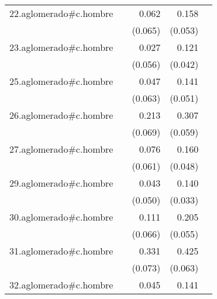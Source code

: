 {\begin{longtable}{l*{4}{D{.}{.}{-1}}}
\addlinespace
22.aglomerado#c.hombre&                     &       0.062         &       0.158\sym{**} &                     \\
            &                     &     (0.065)         &     (0.053)         &                     \\
\addlinespace
23.aglomerado#c.hombre&                     &       0.027         &       0.121\sym{**} &                     \\
            &                     &     (0.056)         &     (0.042)         &                     \\
\addlinespace
25.aglomerado#c.hombre&                     &       0.047         &       0.141\sym{**} &                     \\
            &                     &     (0.063)         &     (0.051)         &                     \\
\addlinespace
26.aglomerado#c.hombre&                     &       0.213\sym{**} &       0.307\sym{***}&                     \\
            &                     &     (0.069)         &     (0.059)         &                     \\
\addlinespace
27.aglomerado#c.hombre&                     &       0.076         &       0.160\sym{***}&                     \\
            &                     &     (0.061)         &     (0.048)         &                     \\
\addlinespace
29.aglomerado#c.hombre&                     &       0.043         &       0.140\sym{***}&                     \\
            &                     &     (0.050)         &     (0.033)         &                     \\
\addlinespace
30.aglomerado#c.hombre&                     &       0.111         &       0.205\sym{***}&                     \\
            &                     &     (0.066)         &     (0.055)         &                     \\
\addlinespace
31.aglomerado#c.hombre&                     &       0.331\sym{***}&       0.425\sym{***}&                     \\
            &                     &     (0.073)         &     (0.063)         &                     \\
\addlinespace
32.aglomerado#c.hombre&                     &       0.045         &       0.141\sym{***}&                     \\

\end{longtable}}
